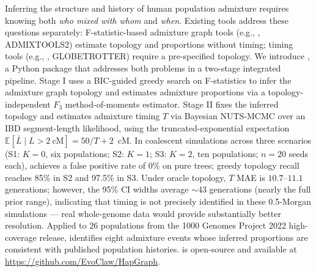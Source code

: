 
Inferring the structure and history of human population admixture requires
knowing both \emph{who mixed with whom} and \emph{when}.
Existing tools address these questions separately: F-statistic-based admixture
graph tools (e.g., \treemix{}, \textsc{ADMIXTOOLS2}) estimate topology and
proportions without timing; timing tools (e.g., \alder{}, \textsc{GLOBETROTTER})
require a pre-specified topology.
We introduce \hapgraph{}, a Python package that addresses both
problems in a two-stage integrated pipeline.
Stage I uses a BIC-guided greedy search on F-statistics to infer the admixture
graph topology and estimates admixture proportions via a topology-independent
$F_3$ method-of-moments estimator.
Stage II fixes the inferred topology and estimates admixture timing $T$ via
Bayesian NUTS-MCMC over an IBD segment-length likelihood, using the
truncated-exponential expectation $\mathbb{E}[\bar{L} \mid L > 2~\text{cM}]
= 50/T + 2$~cM.
In coalescent simulations across three scenarios (S1: $K=0$, six populations;
S2: $K=1$; S3: $K=2$, ten populations; $n=20$ seeds each), \hapgraph{}
achieves a false positive rate of 0\% on pure trees; greedy topology recall
reaches 85\% in S2 and 97.5\% in S3.
Under oracle topology, $T$ MAE is $10.7$--$11.1$ generations; however,
the 95\% CI widths average $\sim$43 generations (nearly the full prior
range), indicating that timing is not precisely identified in these
0.5-Morgan simulations --- real whole-genome data would provide
substantially better resolution.
Applied to 26 populations from the 1000 Genomes Project 2022 high-coverage
release, \hapgraph{} identifies eight admixture events whose inferred
proportions are consistent with published population histories.
\hapgraph{} is open-source and available at \url{https://github.com/EvoClaw/HapGraph}.
